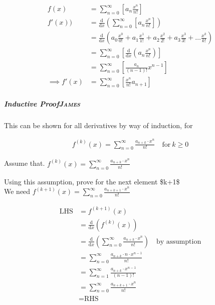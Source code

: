 \documentclass[11pt]{article}
\begin{document}
\begin{align}
    f\left( x \right) &= \sum^{\infty}_{n= 0}   \left[ a_n \frac{x^n}{n!} \right] \label{eq:exp-pow-series} \\
f'\left( x \right)) &= \frac{\mathrm{d} }{\mathrm{d} x}\left( \sum^{\infty}_{n= 0}   \left[ a_n \frac{x^n}{n!} \right]  \right) \nonumber \\
&= \frac{\mathrm{d}}{\mathrm{d} x} \left( a_0 \frac{x^0}{0!} +  a_1 \frac{x^1}{1!} +  a_2 \frac{x^2}{2!}+  a_3 \frac{x^3}{3! } +  \ldots \frac{x^k}{k!} \right) \nonumber \\
&= \sum^{\infty}_{n= 0}   \left[ \frac{\mathrm{d} }{\mathrm{d} x}\left( a_n \frac{x^n}{n!} \right) \right] \nonumber \\
&= \sum^{\infty}_{n= 0}   {\left[{ \frac{a_n}{{\left({ n- 1 }\right)!}} } x^{n- 1}  \right]} \nonumber \\
\implies f'(x) &= \sum^{\infty}_{n= 0}   {\left[{ \frac{x^n}{n!}a_{n+  1} }\right]} \label{eq:exp-pow-series-sol}
\end{align}

\subparagraph[Inductive Proof]{Inductive Proof\hfill{}\textsc{James}}
\label{sec:org9047f69}
This can be shown for all derivatives by way of induction, for

\begin{align}
f^{(k)}\left(x\right) = \sum_{n=0}^\infty\frac{a_{n+k}\cdot x^n}{n!} \quad \text{for}~k \ge 0
\end{align}

Assume that. \(f^{(k)}\left(x\right) = \sum_{n=0}^\infty\frac{a_{n+k}\cdot x^n}{n!}\)

Using this assumption, prove for the next element \$k+1\$\\

We need \(f^{(k+1)}(x) = \sum_{n=0}^\infty\frac{a_{n+k+1}\cdot x^n}{n!}\)

\begin{align*}
    \text{LHS} &= f^{(k+1)}(x)\\
    &= \frac{\mathrm{d}}{\mathrm{d}x}\left(f^{(k)}(x)\right)\\
    &= \frac{\mathrm{d}}{\mathrm{d}x}\left(\sum_{n=0}^\infty\frac{a_{n+k}\cdot x^n}{n!}\right)\quad \text{by assumption}\\
    &= \sum_{n=0}^\infty\frac{a_{n+k}\cdot n\cdot x^{n-1}}{n!}\\
    &= \sum_{n=1}^\infty\frac{a_{n+k}\cdot x^{n-1}}{(n-1)!}\\
    &= \sum_{n=0}^\infty\frac{a_{n+k+1}\cdot x^{n}}{n!}\\
    &= \text{RHS}
\end{align*}
\end{document}
